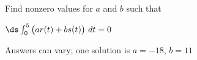 {Find nonzero values for $a$ and $b$ such that 

$\ds \int_0^5 \big(ar(t)+bs(t)\big) \ dt=0$
}
{Answers can vary; one solution is $a=-18$, $b=11$
}

